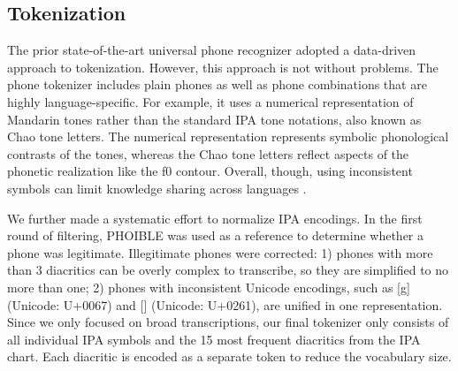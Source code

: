\documentclass[11pt]{article}
\begin{document}
\begin{table}[]
\small
\centering
{}
\caption{A list of the evaluation datasets. These datasets cover a wide range of languages and sociophonetic conditions. }
\label{tab: eval_dataset}
\end{table}


\subsection{Tokenization} 
The prior state-of-the-art universal phone recognizer \cite{xu22b_interspeech} adopted a data-driven approach to tokenization. However, this approach is not without problems. The phone tokenizer includes plain phones as well as phone combinations that are highly language-specific. For example, it uses a numerical representation of Mandarin tones rather than the standard IPA tone notations, also known as Chao tone letters. The numerical representation represents symbolic phonological contrasts of the tones, whereas the Chao tone letters reflect aspects of the phonetic realization like the f0 contour. Overall, though, using inconsistent symbols can limit knowledge sharing across languages \cite{zhu-etal-2024-taste}. 

We further made a systematic effort to normalize IPA encodings. In the first round of filtering, PHOIBLE \cite{moran2014phoible} was used as a reference to determine whether a phone was legitimate. Illegitimate phones were corrected: 1) phones with more than 3 diacritics can be overly complex to transcribe, so they are simplified to no more than one; 2) phones with inconsistent Unicode encodings, such as [g] (Unicode: U+0067) and [] (Unicode: U+0261), are unified in one representation. Since we only focused on broad transcriptions, our final tokenizer only consists of all individual IPA symbols and the 15 most frequent diacritics from the IPA chart. Each diacritic is encoded as a separate token to reduce the vocabulary size. 
\end{document}
